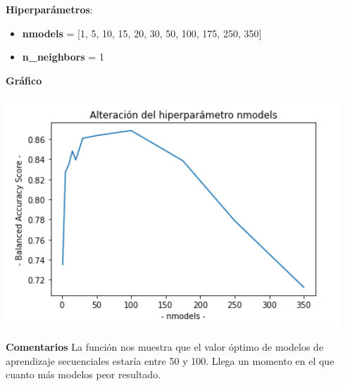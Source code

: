 \documentclass[conference,a4paper]{IEEEtran}
\begin{document}
\begin{textb}
    \textbf{Hiperparámetros}:
  \begin{itemize}
      \item \textbf{nmodels} = [1, 5, 10, 15, 20, 30, 50, 100, 175, 250, 350]
      \item \textbf{n\_neighbors} = 1
  \end{itemize}
  \textbf{Gráfico}
  
  \begin{center}
    \includegraphics[scale=0.80]{figures/nmodels_titanic_knn.png}
    \label{fig:funcion_clasificacion}
  \end{center}
  
  \textbf{Comentarios} La función nos muestra que el valor óptimo de modelos de aprendizaje secuenciales estaría entre 50 y 100. Llega un momento en el que cuanto más modelos peor resultado.
\end{textb}
\end{document}
